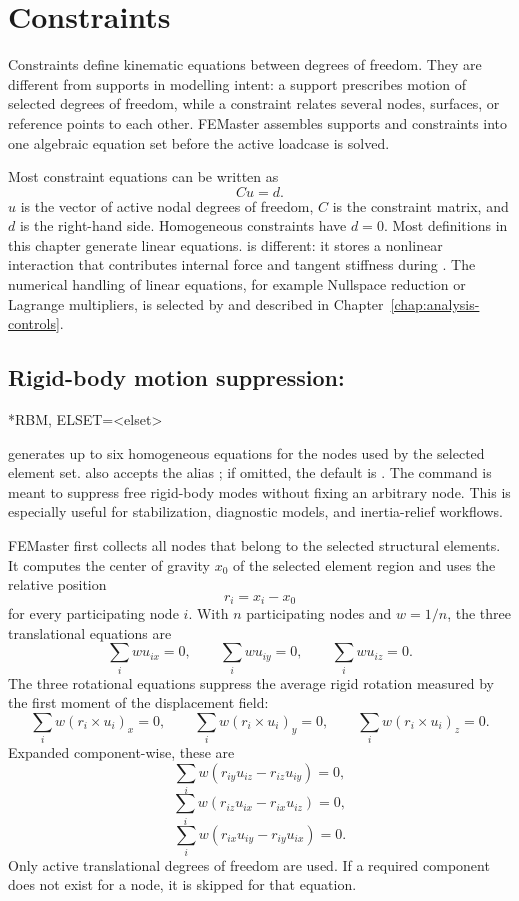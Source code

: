 \chapter{Constraints}
\label{chap:constraints}

Constraints define kinematic equations between degrees of freedom. They are different from supports in modelling intent: a support prescribes motion of selected degrees of freedom, while a constraint relates several nodes, surfaces, or reference points to each other. FEMaster assembles supports and constraints into one algebraic equation set before the active loadcase is solved.

Most constraint equations can be written as
\[
C u = d .
\]
\(u\) is the vector of active nodal degrees of freedom, \(C\) is the constraint matrix, and \(d\) is the right-hand side. Homogeneous constraints have \(d=0\). Most definitions in this chapter generate linear equations.  is different: it stores a nonlinear interaction that contributes internal force and tangent stiffness during . The numerical handling of linear equations, for example Nullspace reduction or Lagrange multipliers, is selected by  and described in Chapter~\ref{chap:analysis-controls}.

\section{Rigid-body motion suppression: }

\begin{syntax}
*RBM, ELSET=<elset>
\end{syntax}

 generates up to six homogeneous equations for the nodes used by the selected element set.  also accepts the alias ; if omitted, the default is . The command is meant to suppress free rigid-body modes without fixing an arbitrary node. This is especially useful for stabilization, diagnostic models, and inertia-relief workflows.

FEMaster first collects all nodes that belong to the selected structural elements. It computes the center of gravity \(x_0\) of the selected element region and uses the relative position
\[
r_i = x_i - x_0
\]
for every participating node \(i\). With \(n\) participating nodes and \(w=1/n\), the three translational equations are
\[
\sum_i w u_{ix}=0,\qquad
\sum_i w u_{iy}=0,\qquad
\sum_i w u_{iz}=0 .
\]
The three rotational equations suppress the average rigid rotation measured by the first moment of the displacement field:
\[
\sum_i w(r_i \times u_i)_x = 0,\qquad
\sum_i w(r_i \times u_i)_y = 0,\qquad
\sum_i w(r_i \times u_i)_z = 0 .
\]
Expanded component-wise, these are
\[
\sum_i w(r_{iy}u_{iz}-r_{iz}u_{iy})=0,
\]
\[
\sum_i w(r_{iz}u_{ix}-r_{ix}u_{iz})=0,
\]
\[
\sum_i w(r_{ix}u_{iy}-r_{iy}u_{ix})=0.
\]
Only active translational degrees of freedom are used. If a required component does not exist for a node, it is skipped for that equation.

